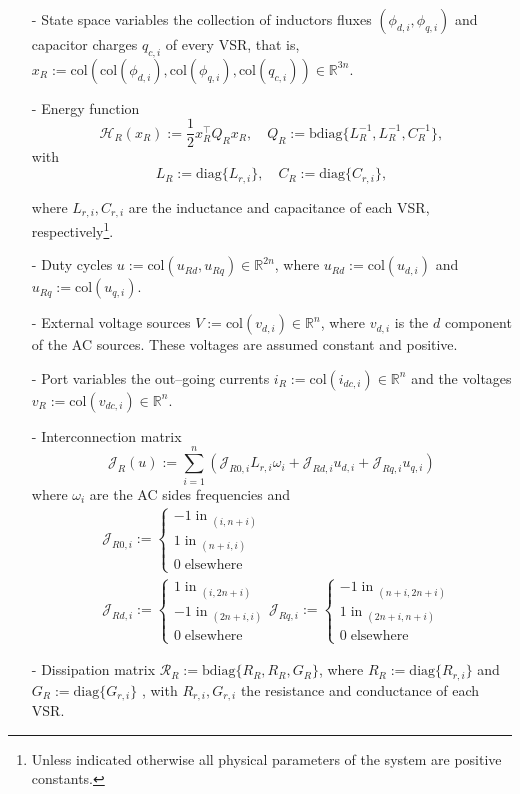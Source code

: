 \documentclass[5p,twocolumn]{elsarticle}
\def\diag{\mbox{diag}}
\def\col{\mbox{col}}
\def\begequ{\begin{equation}}
\def\endequ{\end{equation}}
\numberwithin{equation}{section}
\begin{document}
\begin{itemize}
\item[-] State space variables the collection of inductors fluxes $(\phi_{d,i}, \phi_{q,i})$ and capacitor charges $q_{c,i}$ of every VSR, that is, $x_{R}:=\col(\col(\phi_{d,i}), \col(\phi_{q,i}), \col(q_{c,i})) \in\mathbb{R}^{3n}$.

\item[-] Energy function 
\begin{equation*}
\mathcal{H}_{R}(x_{R}):=\frac{1}{2} x_{R}^\top Q_{R} x_{R},\quad Q_R:=\mathrm{bdiag}\{L_R^{-1},L_R^{-1},C_R^{-1}\},
\end{equation*}
with
$$
L_{R}:=\mathrm{diag}\{L_{r,i}\} ,\quad  C_{R}:=\mathrm{diag}\{C_{r,i}\},
$$

where $L_{r,i},C_{r,i}$ are the inductance and capacitance of each VSR, respectively\footnote{Unless indicated otherwise all physical parameters of the system are positive constants.}.

\item[-] Duty cycles $u:=\col(u_{Rd},u_{Rq}) \in\mathbb{R}^{2n}$, where $u_{Rd}:=\col(u_{d,i})$ and $u_{Rq}:=\col(u_{q,i})$.

\item[-] External voltage sources $V:=\col (v_{d,i})\in\mathbb{R}^n$, where $v_{d,i}$ is the $d$ component of the AC sources. These voltages are assumed constant and positive.

\item[-] Port variables the out--going currents $i_{R}:=\col(i_{dc,i})\in\mathbb{R}^n$ and the voltages $v_{R}:=\col(v_{dc,i})\in\mathbb{R}^n$.

\item[-] Interconnection matrix
\begequ
\label{Jdecomp}
\mathcal{J}_{R}(u):=\sum_{i=1}^n(\mathcal{J}_{R0,i}L_{r,i}\omega_i+\mathcal{J}_{Rd,i}u_{d,i}+\mathcal{J}_{Rq,i}u_{q,i})
\endequ
 where $\omega_i $ are the AC sides frequencies and
\begin{align*}
&\mathcal{J}_{R0,i}:=\begin{cases}-1\;\mathrm{in}\; _{(i,n+i)}\\
 1\;\mathrm{in}\; _{(n+i,i)}\\
0\;\mathrm{elsewhere}
\end{cases}\\
&  \mathcal{J}_{Rd,i} :=\begin{cases}1\;\mathrm{in}\; _{(i,2n+i)}\\
 -1\;\mathrm{in}\; _{(2n+i,i)}\\
0\;\mathrm{elsewhere}
\end{cases} 
\mathcal{J}_{Rq,i} :=\begin{cases}-1\;\mathrm{in}\; _{(n+i,2n+i)}\\
 1\;\mathrm{in}\; _{(2n+i,n+i)}\\
0\;\mathrm{elsewhere}
\end{cases}
\end{align*}
\item[-] Dissipation matrix $\mathcal{R}_R:=\mathrm{bdiag}\{R_R ,R_R ,G_R \}$, where $R_{R}:=\diag\{R_{r,i}\}$ and $G_{R}:=\diag\{G_{r,i}\}$ , with $R_{r,i},G_{r,i}$ the resistance and conductance of each VSR.


\end{itemize}
\end{document}
